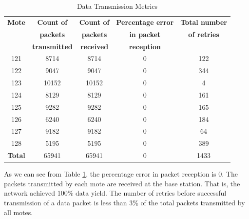 \begin{table}[htbp]
\begin{center}
\begin{tabular}{|c|c|c|c|c|}
\hline 
\textbf{Mote} & \textbf{Count of} & \textbf{Count of} & \textbf{Percentage error} & \textbf{Total number} \\ 
 &   \textbf{packets}   &  \textbf{packets}  & \textbf{in packet} & \textbf{of retries}\\
 & \textbf{transmitted}  & \textbf{received} & \textbf{reception} & \\
\hline  
\hline  
121 & 8714 & 8714 & 0 & 122 \\ 
\hline 
122 & 9047 & 9047 & 0 & 344 \\  
\hline 
123 & 10152 & 10152 & 0 & 4 \\ 
\hline 
124 & 8129 & 8129 & 0 & 161 \\ 
\hline 
125 & 9282 & 9282 & 0 & 165 \\ 
\hline 
126 & 6240 & 6240 & 0 & 184 \\  
\hline 
127 & 9182 & 9182 & 0 & 64 \\ 
\hline 
128 & 5195 & 5195 & 0 & 389 \\ 
\hline 
\hline
\textbf{Total} & 65941 & 65941 & 0 & 1433 \\
\hline
\end{tabular}
\end{center}
\caption{Data Transmission Metrics}
\label{table_dataTransmitted}
\end{table}

As we can see from Table \ref{table_dataTransmitted}, the percentage error in packet reception is 0. The packets transmitted by each mote are received at the base station. That is, the network achieved 100\% data yield. The number of retries before successful transmission of a data packet is less than 3\% of the total packets transmitted by all motes.


